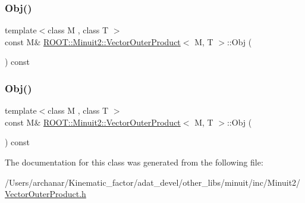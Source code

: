 \subsubsection{\texorpdfstring{Obj()}{Obj()}\hspace{0.1cm}{\footnotesize\ttfamily [1/2]}}
{\footnotesize\ttfamily template$<$class M , class T $>$ \\
const M\& \mbox{\hyperlink{classROOT_1_1Minuit2_1_1VectorOuterProduct}{R\+O\+O\+T\+::\+Minuit2\+::\+Vector\+Outer\+Product}}$<$ M, T $>$\+::Obj (\begin{DoxyParamCaption}{ }\end{DoxyParamCaption}) const\hspace{0.3cm}{\ttfamily [inline]}}

\mbox{\label{classROOT_1_1Minuit2_1_1VectorOuterProduct_a9326f6e70b3760159b6b74dded8311d3}} 
\subsubsection{\texorpdfstring{Obj()}{Obj()}\hspace{0.1cm}{\footnotesize\ttfamily [2/2]}}
{\footnotesize\ttfamily template$<$class M , class T $>$ \\
const M\& \mbox{\hyperlink{classROOT_1_1Minuit2_1_1VectorOuterProduct}{R\+O\+O\+T\+::\+Minuit2\+::\+Vector\+Outer\+Product}}$<$ M, T $>$\+::Obj (\begin{DoxyParamCaption}{ }\end{DoxyParamCaption}) const\hspace{0.3cm}{\ttfamily [inline]}}



The documentation for this class was generated from the following file\+:\begin{DoxyCompactItemize}
\item 
/\+Users/archanar/\+Kinematic\+\_\+factor/adat\+\_\+devel/other\+\_\+libs/minuit/inc/\+Minuit2/\mbox{\hyperlink{other__libs_2minuit_2inc_2Minuit2_2VectorOuterProduct_8h}{Vector\+Outer\+Product.\+h}}\end{DoxyCompactItemize}
